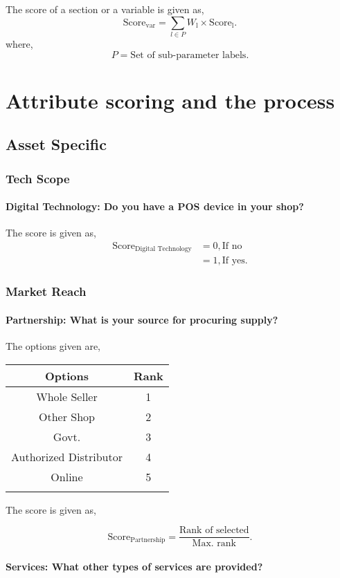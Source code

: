 \documentclass[oneside,twocolumn]{article}
\newcommand{\tsub}[2]{\text{#1}_{\text{#2}}}
\newcommand{\tsubb}[2]{#1_{\text{#2}}}
\newcommand{\dsub}[2]{\dfrac{\text{#1}}{\text{#2}}}
\newcommand{\singsel}[1]
{
	\[
		\tsub{Score}{#1} = \dsub{Rank of selected}{Max. rank}.
	\]
}
\newenvironment{ttable}
{
\begin{center}
\begin{tabular}{c|c}
\hline
}
{
\\ \hline
\end{tabular}
\end{center}
}
\begin{document}
The score of a section or a variable is given as,
\[
	\tsub{Score}{var} = \sum_{l \in P} \tsubb{W}{l} \times \tsub{Score}{l}.
\]
where,
\[
	P = \text{Set of sub-parameter labels.}
\]
\section{Attribute scoring and the
process}
\subsection{Asset Specific}
\subsubsection{Tech Scope}

\paragraph{Digital Technology: Do you have a POS device in your shop?}

The score is given as,
\begin{align*}
\tsub{Score}{Digital Technology} &= 0, \text{If no} \\
        &= 1, \text{If yes}.
\end{align*}
\subsubsection{Market Reach}

\paragraph{Partnership: What is your source for procuring supply?}

The options given are,
\begin{ttable}
Options & Rank \\ \hline
Whole Seller & 1 \\
Other Shop & 2 \\
Govt. & 3 \\
Authorized Distributor & 4 \\
Online & 5 \\
\hline
\end{ttable}
The score is given as,
\singsel{Partnership}
\paragraph{Services: What other types of services are provided?}
\end{document}
